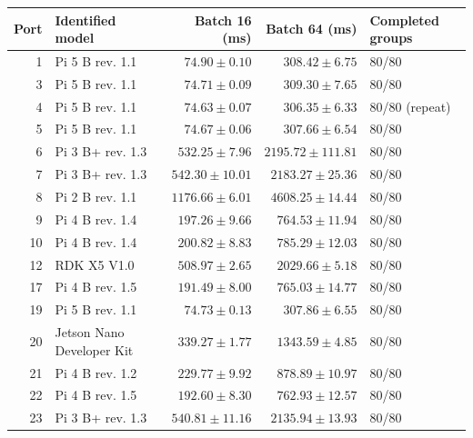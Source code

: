 \begin{tabular}{@{}rlrrl@{}}
\toprule
Port & Identified model & Batch 16 (ms) & Batch 64 (ms) & Completed groups\\
\midrule
1 & Pi 5 B rev. 1.1 & $74.90\pm0.10$ & $308.42\pm6.75$ & 80/80 \\
3 & Pi 5 B rev. 1.1 & $74.71\pm0.09$ & $309.30\pm7.65$ & 80/80 \\
4 & Pi 5 B rev. 1.1 & $74.63\pm0.07$ & $306.35\pm6.33$ & 80/80 (repeat) \\
5 & Pi 5 B rev. 1.1 & $74.67\pm0.06$ & $307.66\pm6.54$ & 80/80 \\
6 & Pi 3 B+ rev. 1.3 & $532.25\pm7.96$ & $2195.72\pm111.81$ & 80/80 \\
7 & Pi 3 B+ rev. 1.3 & $542.30\pm10.01$ & $2183.27\pm25.36$ & 80/80 \\
8 & Pi 2 B rev. 1.1 & $1176.66\pm6.01$ & $4608.25\pm14.44$ & 80/80 \\
9 & Pi 4 B rev. 1.4 & $197.26\pm9.66$ & $764.53\pm11.94$ & 80/80 \\
10 & Pi 4 B rev. 1.4 & $200.82\pm8.83$ & $785.29\pm12.03$ & 80/80 \\
12 & RDK X5 V1.0 & $508.97\pm2.65$ & $2029.66\pm5.18$ & 80/80 \\
17 & Pi 4 B rev. 1.5 & $191.49\pm8.00$ & $765.03\pm14.77$ & 80/80 \\
19 & Pi 5 B rev. 1.1 & $74.73\pm0.13$ & $307.86\pm6.55$ & 80/80 \\
20 & Jetson Nano Developer Kit & $339.27\pm1.77$ & $1343.59\pm4.85$ & 80/80 \\
21 & Pi 4 B rev. 1.2 & $229.77\pm9.92$ & $878.89\pm10.97$ & 80/80 \\
22 & Pi 4 B rev. 1.5 & $192.60\pm8.30$ & $762.93\pm12.57$ & 80/80 \\
23 & Pi 3 B+ rev. 1.3 & $540.81\pm11.16$ & $2135.94\pm13.93$ & 80/80 \\
\bottomrule
\end{tabular}
